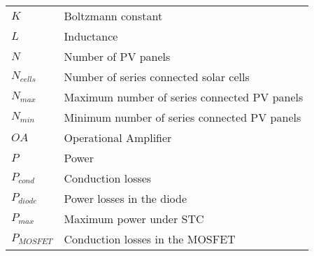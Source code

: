 \begin{tabular}{ll}
$K$ & Boltzmann constant \\
$L$ & Inductance\\
$N$ & Number of PV panels \\
$N_{cells}$ & Number of series connected solar cells \\ 
$N_{max}$ & Maximum number of series connected PV panels \\
$N_{min}$ & Minimum number of series connected PV panels \\
$OA$ & Operational Amplifier \\
$P$ & Power\\
$P_{cond}$ & Conduction losses \\
$P_{diode}$ & Power losses in the diode \\
$P_{max}$ & Maximum power under STC\\
$P_{MOSFET}$ & Conduction losses in the MOSFET \\
\end{tabular}
\newpage

